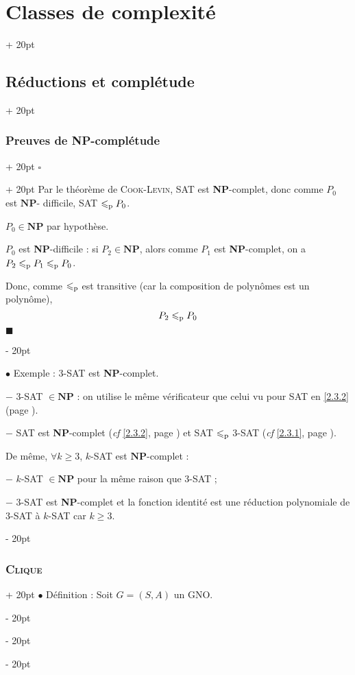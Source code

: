 \documentclass[a4paper, 12pt, twoside]{article}
\renewcommand{\le}{\leqslant}
\renewcommand{\ge}{\geqslant}
\newcommand{\ind}[1][20pt]{\advance\leftskip + #1}
\newcommand{\deind}[1][20pt]{\advance\leftskip - #1}
\newenvironment{indt}[2][20pt]{#2 \par \ind[#1]}{\par \deind} %
\newenvironment{proof}[1][{}]{\begin{indt}{$\square$ #1}}{$\blacksquare$ \end{indt}}
\begin{document}
\begin{indt}{\section{Classes de complexité}}
\begin{indt}{\subsection{Réductions et complétude}}
\begin{indt}{\subsubsection{Preuves de \textbf{NP}-complétude}}
\begin{proof}
                    Par le théorème de \textsc{Cook-Levin}, SAT est \textbf{NP}-complet, donc comme $P_0$ est $\mathbf{NP}$- difficile, SAT $\le_{\rm p} P_0$.

                    \vspace{6pt}
                    
                    \boxed{\Leftarrow} $P_0 \in \mathbf{NP}$ par hypothèse.

                    $P_0$ est \textbf{NP}-difficile : si $P_2 \in \mathbf{NP}$, alors comme $P_1$ est \textbf{NP}-complet, on a $P_2 \le_{\rm p} P_1 \le_{\rm p} P_0$.

                    Donc, comme $\le_{\rm p}$ est transitive (car la composition de polynômes est un polynôme),
                    \[
                        P_2 \le_{\rm p} P_0
                    \]
                \end{proof}

                \vspace{12pt}
                
                $\bullet$ Exemple : 3-SAT est \textbf{NP}-complet.

                $-$ 3-SAT $\in \mathbf{NP}$ : on utilise le même vérificateur que celui vu pour SAT en \ref{2.3.2} (page \pageref{2.3.2}).

                $-$ SAT est \textbf{NP}-complet (\textit{cf} \ref{2.3.2}, page \pageref{2.3.2}) et SAT $\le_{\rm p}$ 3-SAT (\textit{cf} \ref{2.3.1}, page \pageref{2.3.1}).

                \vspace{6pt}
                
                De même, $\forall k \ge 3$, $k$-SAT est $\mathbf{NP}$-complet :

                $-$ $k$-SAT $\in \mathbf{NP}$ pour la même raison que $3$-SAT ;

                $-$ $3$-SAT est \textbf{NP}-complet et la fonction identité est une réduction polynomiale de $3$-SAT à $k$-SAT car $k \ge 3$.
            \end{indt}

            \vspace{12pt}
            
            \begin{indt}{\subsubsection{\textsc{Clique}}}
                $\bullet$ Définition :
                Soit $G = (S, A)$ un GNO.


\end{indt}
\end{indt}
\end{indt}
\end{document}
